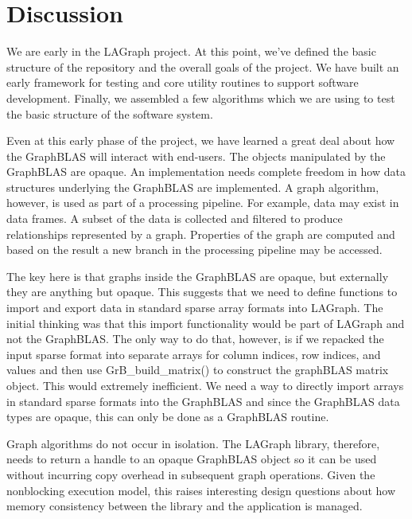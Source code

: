 \section{Discussion}
\label{sec:disc}

We are early in the LAGraph project.  At this point, we've defined the basic structure of the
repository and the overall goals of the project. We have built an early framework for testing
and core utility routines to support software development.  Finally, we assembled a few algorithms which we
are using to test the basic structure of the software system.

Even at this early phase of the project, we have learned a great deal about how the GraphBLAS
will interact with end-users.  The objects manipulated by the GraphBLAS are opaque.  An implementation
needs complete freedom in how data structures underlying the GraphBLAS are implemented.  
A graph algorithm, however, is used as part of a processing pipeline.  For example, data may
exist in data frames.  A subset of the data is collected and filtered to produce relationships
represented by a graph. Properties of the graph are computed and based on the result 
a new branch in the processing pipeline may be accessed.  

The key here is that graphs inside the GraphBLAS are opaque, but externally they are 
anything but opaque.  This suggests that we need to define functions to import and export 
data in standard sparse array formats into LAGraph.   The initial thinking was that this
import functionality would be part of LAGraph and not the GraphBLAS.  The only way to 
do that, however, is if we repacked the input sparse format into separate arrays for column 
indices, row indices, and values and then use GrB\_build\_matrix() to construct the graphBLAS
matrix object.  This would extremely inefficient.  We need a way to directly import arrays 
in standard sparse formats into the GraphBLAS and since the GraphBLAS data types are
opaque, this can only be done as a GraphBLAS routine.  

Graph algorithms do not occur in isolation.   The LAGraph library, therefore, needs to 
return a handle to an opaque GraphBLAS object so it can be used without incurring copy overhead
in subsequent graph operations.  Given the nonblocking execution model, this raises interesting
design questions about how memory consistency between the library and the application is
managed.  

